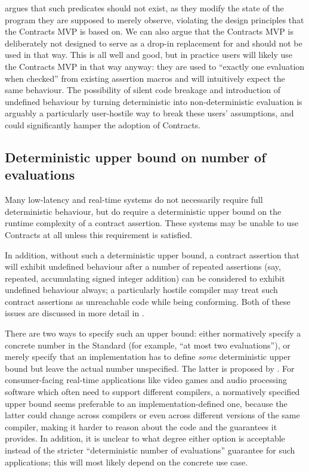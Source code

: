 \cite{P2900R6} argues that such predicates should not exist, as they modify the state of the program they are supposed to merely observe, violating the design principles that the Contracts MVP is based on. We can also argue that the Contracts MVP is deliberately not designed to serve as a drop-in replacement for  and should not be used in that way. This is all well and good, but in practice users will likely use the Contracts MVP in that way anyway: they are used to ``exactly one evaluation when checked'' from existing assertion macros and will intuitively expect the same behaviour. The possibility of silent code breakage and introduction of undefined behaviour by turning deterministic into non-deterministic evaluation is arguably a particularly user-hostile way to break these users' assumptions, and could significantly hamper the adoption of Contracts.

\subsection{Deterministic upper bound on number of evaluations}
\label{subsec:upper}

Many low-latency and real-time systems do not necessarily require full deterministic behaviour, but do require a deterministic upper bound on the runtime complexity of a contract assertion. These systems may be unable to use Contracts at all unless this requirement is satisfied.

In addition, without such a deterministic upper bound, a contract assertion that will exhibit undefined behaviour after a number of repeated assertions (say, repeated, accumulating signed integer addition) can be considered to exhibit undefined behaviour always; a particularly hostile compiler may treat such contract assertions as unreachable code while being conforming. Both of these issues are discussed in more detail in \cite{P3119R0}.

There are two ways to specify such an upper bound: either normatively specify a concrete number in the Standard (for example, ``at most two evaluations''), or merely specify that an implementation has to define \emph{some} deterministic upper bound but leave the actual number unspecified. The latter is proposed by \cite{P3119R0}. For consumer-facing real-time applications like video games and audio processing software which often need to support different compilers, a normatively specified upper bound seems preferable to an implementation-defined one, because the latter could change across compilers or even across different versions of the same compiler, making it harder to reason about the code and the guarantees it provides. In addition, it is unclear to what degree either option is acceptable instead of the stricter ``deterministic number of evaluations'' guarantee for such applications; this will most likely depend on the concrete use case.

